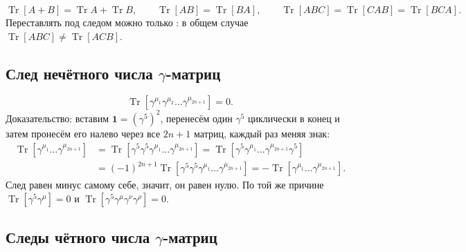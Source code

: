 \documentclass[../final.tex]{subfiles}
\begin{document}
\begin{equation*}
    \operatorname{Tr}[A+B]=\operatorname{Tr}A+\operatorname{Tr}B,
    \qquad
    \operatorname{Tr}[AB]=\operatorname{Tr}[BA],
    \qquad
    \operatorname{Tr}[ABC]=\operatorname{Tr}[CAB]=\operatorname{Tr}[BCA].
\end{equation*}
Переставлять под следом можно только :
в общем случае $\operatorname{Tr}[ABC]\ne\operatorname{Tr}[ACB]$.

\subsection*{След нечётного числа \texorpdfstring{$\gamma$}{γ}-матриц}

\begin{equation*}
    \operatorname{Tr}\left[\gamma^{\mu_1}\gamma^{\mu_2}\ldots\gamma^{\mu_{2n+1}}\right]=0.
\end{equation*}
Доказательство: вставим $\mathbf 1=(\gamma^5)^2$, перенесём один $\gamma^5$
циклически в конец и затем пронесём его налево через все $2n+1$ матриц,
каждый раз меняя знак:
\begin{align*}
    \operatorname{Tr}\left[\gamma^{\mu_1}\ldots\gamma^{\mu_{2n+1}}\right]
    &=\operatorname{Tr}\left[\gamma^5\gamma^5\gamma^{\mu_1}\ldots\gamma^{\mu_{2n+1}}\right]
    =\operatorname{Tr}\left[\gamma^5\gamma^{\mu_1}\ldots\gamma^{\mu_{2n+1}}\gamma^5\right]\\
    &=(-1)^{2n+1}\operatorname{Tr}\left[\gamma^5\gamma^5\gamma^{\mu_1}\ldots\gamma^{\mu_{2n+1}}\right]
    =-\operatorname{Tr}\left[\gamma^{\mu_1}\ldots\gamma^{\mu_{2n+1}}\right].
\end{align*}
След равен минус самому себе, значит, он равен нулю.
По той же причине $\operatorname{Tr}[\gamma^5\gamma^\mu]=0$
и $\operatorname{Tr}[\gamma^5\gamma^\mu\gamma^\nu\gamma^\rho]=0$.

\subsection*{Следы чётного числа \texorpdfstring{$\gamma$}{γ}-матриц}
\end{document}
